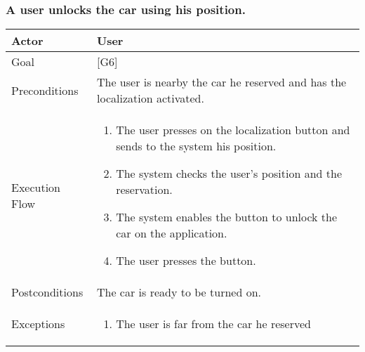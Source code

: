 \documentclass{article}
\begin{document}
	\subsubsection{A user unlocks the car using his position.}
	\begin{tabularx}{\textwidth}{  l  X  }
		\hline
		Actor & User\\
		\hline
		Goal & [G6]\\
		\hline
		Preconditions & The user is nearby the car he reserved and has the localization activated.\\
		\hline
		Execution Flow & \begin{enumerate}
			\item{The user presses on the localization button and sends to the system his position.}
										 \item{The system checks the user's position and the reservation.}
										 \item{The system enables the button to unlock the car on the application.}
										 \item{The user presses the button.}
										\end{enumerate}\\
		\hline
		Postconditions & The car is ready to be turned on.\\
		\hline
		Exceptions & \begin{enumerate}
								 \item{The user is far from the car he reserved}
								\end{enumerate}\\
		\hline
	\end{tabularx}
\end{document}
